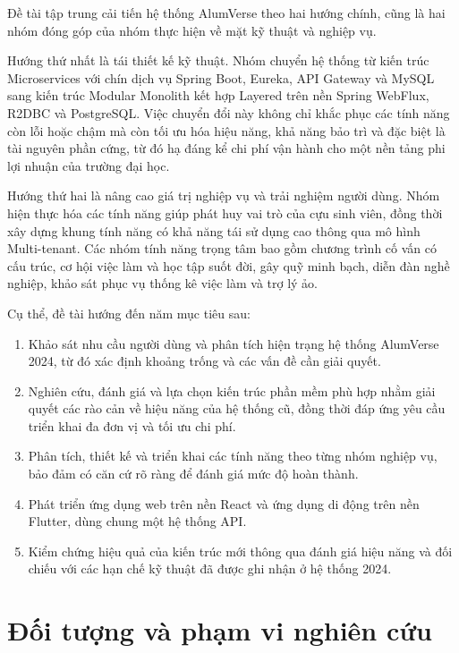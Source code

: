 \documentclass[12pt,a4paper,oneside]{report}
\begin{document}
Đề tài tập trung cải tiến hệ thống AlumVerse theo hai hướng chính, cũng là hai nhóm đóng góp của nhóm thực hiện về mặt kỹ thuật và nghiệp vụ.

Hướng thứ nhất là tái thiết kế kỹ thuật. Nhóm chuyển hệ thống từ kiến trúc Microservices với chín dịch vụ Spring Boot, Eureka, API Gateway và MySQL sang kiến trúc Modular Monolith kết hợp Layered trên nền Spring WebFlux, R2DBC và PostgreSQL. Việc chuyển đổi này không chỉ khắc phục các tính năng còn lỗi hoặc chậm mà còn tối ưu hóa hiệu năng, khả năng bảo trì và đặc biệt là tài nguyên phần cứng, từ đó hạ đáng kể chi phí vận hành cho một nền tảng phi lợi nhuận của trường đại học.

Hướng thứ hai là nâng cao giá trị nghiệp vụ và trải nghiệm người dùng. Nhóm hiện thực hóa các tính năng giúp phát huy vai trò của cựu sinh viên, đồng thời xây dựng khung tính năng có khả năng tái sử dụng cao thông qua mô hình Multi-tenant. Các nhóm tính năng trọng tâm bao gồm chương trình cố vấn có cấu trúc, cơ hội việc làm và học tập suốt đời, gây quỹ minh bạch, diễn đàn nghề nghiệp, khảo sát phục vụ thống kê việc làm và trợ lý ảo.

Cụ thể, đề tài hướng đến năm mục tiêu sau:

\begin{enumerate}[label=(\arabic*),leftmargin=1.4cm,itemsep=2pt]
\item Khảo sát nhu cầu người dùng và phân tích hiện trạng hệ thống AlumVerse 2024, từ đó xác định khoảng trống và các vấn đề cần giải quyết.
\item Nghiên cứu, đánh giá và lựa chọn kiến trúc phần mềm phù hợp nhằm giải quyết các rào cản về hiệu năng của hệ thống cũ, đồng thời đáp ứng yêu cầu triển khai đa đơn vị và tối ưu chi phí.
\item Phân tích, thiết kế và triển khai các tính năng theo từng nhóm nghiệp vụ, bảo đảm có căn cứ rõ ràng để đánh giá mức độ hoàn thành.
\item Phát triển ứng dụng web trên nền React và ứng dụng di động trên nền Flutter, dùng chung một hệ thống API.
\item Kiểm chứng hiệu quả của kiến trúc mới thông qua đánh giá hiệu năng và đối chiếu với các hạn chế kỹ thuật đã được ghi nhận ở hệ thống 2024.
\end{enumerate}

\section{Đối tượng và phạm vi nghiên cứu}
\end{document}
